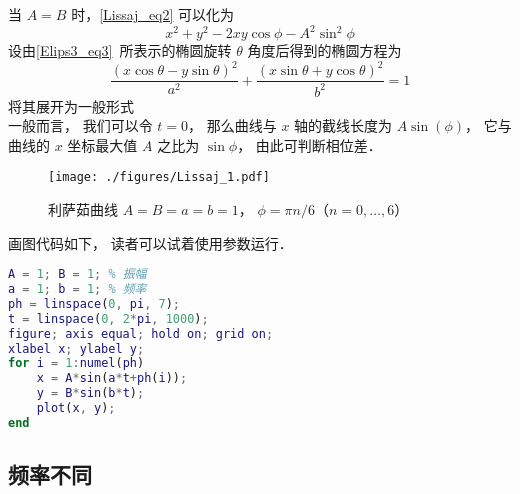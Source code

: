 当 $A=B$ 时，\autoref{Lissaj_eq2} 可以化为
\begin{equation}
x^2+y^2-2xy\cos\phi-A^2\sin^2\phi
\end{equation}
设由\autoref{Elips3_eq3}~所表示的椭圆旋转 $\theta$ 角度后得到的椭圆方程为
\begin{equation}
\frac{(x\cos\theta-y\sin\theta)^2}{a^2}+\frac{(x\sin\theta+y\cos\theta)^2}{b^2}=1
\end{equation}
将其展开为一般形式
\begin{equation}

\end{equation}
一般而言， 我们可以令 $t = 0$， 那么曲线与 $x$ 轴的截线长度为 $A\sin(\phi)$， 它与曲线的 $x$ 坐标最大值 $A$ 之比为 $\sin\phi$， 由此可判断相位差．

\begin{figure}[ht]
\centering
\texttt{[image: ./figures/Lissaj\_1.pdf]}
\caption{利萨茹曲线 $A = B = a = b = 1$， $\phi = \pi n/6$（$n = 0,\dots,6$）} \label{Lissaj_fig1}
\end{figure}

画图代码如下， 读者可以试着使用参数运行．
\begin{lstlisting}[language=matlab, caption=lissajous.m]
% 画利萨茹曲线
A = 1; B = 1; % 振幅
a = 1; b = 1; % 频率
ph = linspace(0, pi, 7);
t = linspace(0, 2*pi, 1000);
figure; axis equal; hold on; grid on;
xlabel x; ylabel y;
for i = 1:numel(ph)
    x = A*sin(a*t+ph(i));
    y = B*sin(b*t);
    plot(x, y);
end
\end{lstlisting}

\subsection{频率不同}
